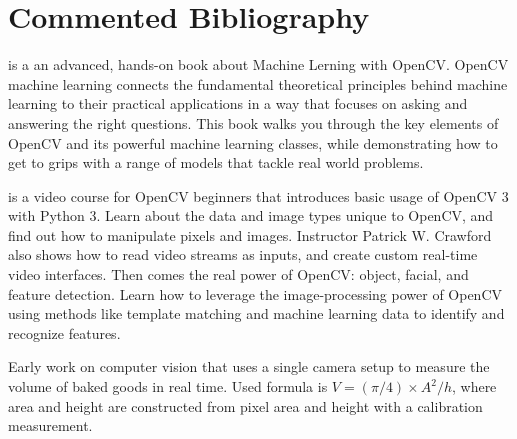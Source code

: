\clearpage
\chapter*{Commented Bibliography}

\newcommand{\parstartcite}[1]{\textbf{\citeauthor{#1}} \textsf{\citetitle{#1}} \newline}

\parstartcite{beyeler2017opencvml} is a an advanced, hands-on book about Machine Lerning with OpenCV.
OpenCV machine learning connects the fundamental theoretical principles
behind machine learning to their practical applications in a way that focuses
on asking and answering the right questions.
This book walks you through the key elements of OpenCV
and its powerful machine learning classes,
while demonstrating how to get to grips with a range of models that tackle real world problems.


\parstartcite{crawford2017opencvpythonvideo} is a video course for OpenCV beginners that introduces basic usage of OpenCV 3 with Python 3. 
Learn about the data and image types unique to OpenCV, and find out how to
manipulate pixels and images. Instructor Patrick W. Crawford also shows how
to read video streams as inputs, and create custom real-time video interfaces.
Then comes the real power of OpenCV: object, facial, and feature detection.
Learn how to leverage the image-processing power of OpenCV using methods like
template matching and machine learning data to identify and recognize features.


\parstartcite{rusu2011pointcloud}

\parstartcite{levine1989microwave}
Early work on computer vision that uses a single camera setup to measure the volume of baked goods in real time. Used formula is $V = (\pi/4) \times A^2/h$, where area and height are constructed from pixel area and height with a calibration measurement.

\parstartcite{wang2017apple}

\parstartcite{hildebrand1997thickness}

\parstartcite{vogiatzis2010stereo}

\parstartcite{taj2010detection}

\parstartcite{hartley2004multiview}

\parstartcite{bostondiditeam2017mv3d}

\parstartcite{chen2017mv3d}

